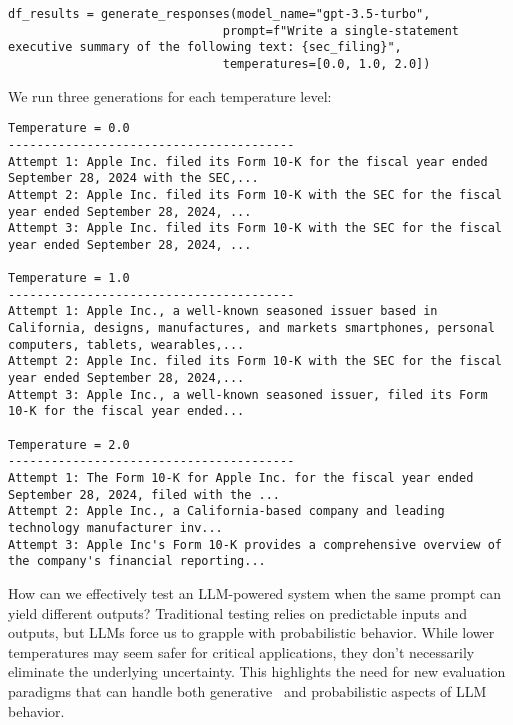 
\begin{verbatim}
df_results = generate_responses(model_name="gpt-3.5-turbo",
                              prompt=f"Write a single-statement executive summary of the following text: {sec_filing}",
                              temperatures=[0.0, 1.0, 2.0])
\end{verbatim}

We run three generations for each temperature level:
\begin{verbatim}
Temperature = 0.0
----------------------------------------
Attempt 1: Apple Inc. filed its Form 10-K for the fiscal year ended September 28, 2024 with the SEC,...
Attempt 2: Apple Inc. filed its Form 10-K with the SEC for the fiscal year ended September 28, 2024, ...
Attempt 3: Apple Inc. filed its Form 10-K with the SEC for the fiscal year ended September 28, 2024, ...

Temperature = 1.0
----------------------------------------
Attempt 1: Apple Inc., a well-known seasoned issuer based in California, designs, manufactures, and markets smartphones, personal computers, tablets, wearables,...
Attempt 2: Apple Inc. filed its Form 10-K with the SEC for the fiscal year ended September 28, 2024,...
Attempt 3: Apple Inc., a well-known seasoned issuer, filed its Form 10-K for the fiscal year ended...

Temperature = 2.0
----------------------------------------
Attempt 1: The Form 10-K for Apple Inc. for the fiscal year ended September 28, 2024, filed with the ...
Attempt 2: Apple Inc., a California-based company and leading technology manufacturer inv...
Attempt 3: Apple Inc's Form 10-K provides a comprehensive overview of the company's financial reporting...
\end{verbatim}

How can we effectively test an LLM-powered system when the same prompt can yield different outputs? Traditional testing relies on predictable inputs and outputs, but LLMs force us to grapple with probabilistic behavior. While lower temperatures may seem safer for critical applications, they don't necessarily eliminate the underlying uncertainty. This highlights the need for new evaluation paradigms that can handle both generative~ and probabilistic aspects of LLM behavior.

